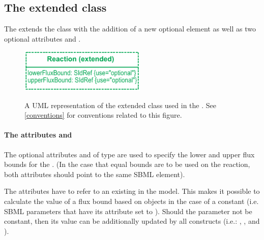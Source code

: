 
\begin{newsection}
\subsection{The extended  class}
\label{reaction-class-ga}

The \FBCPackage extends the \sbmlthreecore \Reaction class with the addition of
a new optional element \GeneProteinAssociation as well as two optional attributes
 and .

\begin{figure}[h]
  \centering
  \includegraphics[width=6cm]{images/v2harmony_fbc_reaction.pdf}\\
  \caption{A UML representation of the extended \SBML \Reaction class used in
  the \FBCPackage. See \ref{conventions} for conventions related to this
  figure.}
  \label{fig:fbc_uml_reaction}
\end{figure}

\paragraph{The attributes  and }
The optional attributes  and  of type
 are used to specify the lower and upper flux bounds for the
\Reaction. (In the case that equal bounds are to be used on the reaction, both
attributes should point to the same SBML element).

The attributes have to refer to an existing \Parameter in the model. This makes
it possible to calculate the value of a flux bound based on \InitialAssignment
objects in the case of a constant \Parameter (i.e. SBML parameters that have its
 attribute set to ). Should the parameter not be
constant, then its value can be additionally updated by all \sbmlthreecore constructs
(i.e.: \EventAssignment, \AssignmentRule, and \AlgebraicRule).


\end{newsection}
